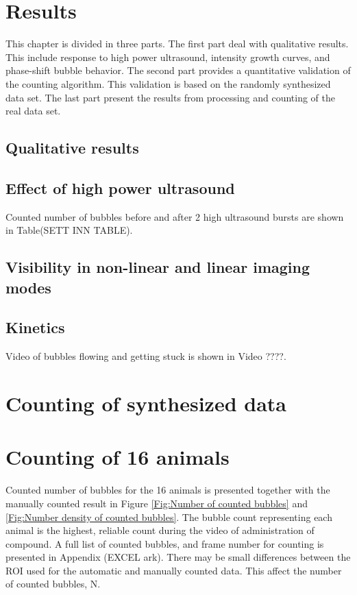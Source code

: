 \section{Results}
This chapter is divided in three parts. The first part deal with qualitative results. This include response to high power ultrasound, intensity growth curves, and phase-shift bubble behavior. The second part provides a quantitative validation of the counting algorithm. This validation is based on the randomly synthesized data set. The last part present the results from processing and counting of the real data set. 
 
\subsection{Qualitative results}

\subsection{Effect of high power ultrasound}
Counted number of bubbles before and after 2 high ultrasound bursts are shown in Table(SETT INN TABLE).
 

\subsection{Visibility in non-linear and linear imaging modes}


\subsection{Kinetics}
Video of bubbles flowing and getting stuck is shown in Video ????.
\section{Counting of synthesized data}


\section{Counting of 16 animals}
Counted number of bubbles for the 16 animals is presented together with the manually counted result in Figure \ref{Fig:Number of counted bubbles} and \ref{Fig:Number density of counted bubbles}. The bubble count representing each animal is the highest, reliable count during the video of administration of compound. A full list of counted bubbles, and frame number for counting is presented in Appendix (EXCEL ark).
There may be small differences between the ROI used for the automatic and manually counted data. This affect the number of counted bubbles, N.

